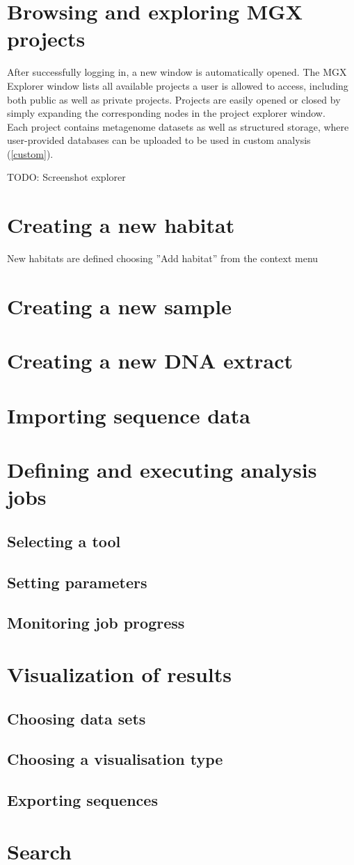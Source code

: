 \section{Browsing and exploring MGX projects}

After successfully logging in, a new window is automatically opened. The MGX Explorer window
lists all available projects a user is allowed to access, including both public as well as
private projects. Projects are easily opened or closed by simply expanding the corresponding
nodes in the project explorer window.\\

Each project contains metagenome datasets as well as structured storage, where user-provided
databases can be uploaded to be used in custom analysis (\ref{custom}).

TODO: Screenshot explorer

\section{Creating a new habitat}

New habitats are defined choosing ''Add habitat'' from the context menu 
\section{Creating a new sample}
\section{Creating a new DNA extract}
\section{Importing sequence data}
\section{Defining and executing analysis jobs}
\subsection{Selecting a tool}
\subsection{Setting parameters}
\subsection{Monitoring job progress}
\section{Visualization of results}
\subsection{Choosing data sets}
\subsection{Choosing a visualisation type}
\subsection{Exporting sequences}
\section{Search}


